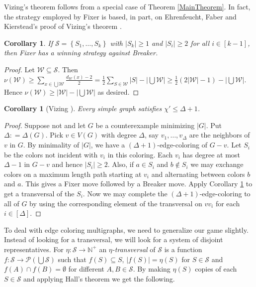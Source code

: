 \documentclass[12pt]{amsart}
\theoremstyle{plain}
\newtheorem{cor}[thm]{Corollary}
\theoremstyle{definition}
\theoremstyle{remark}
\newcommand{\fancy}[1]{\mathcal{#1}}
\newcommand{\IN}{\mathbb{N}}
\newcommand{\set}[1]{\left\{ #1 \right\}}
\newcommand{\card}[1]{\left|#1\right|}
\newcommand{\func}[3]{#1\colon #2 \rightarrow #3}
\newcommand{\irange}[1]{\left[#1\right]}
\newcommand{\parens}[1]{\left( #1 \right)}
\newcommand{\DefinedAs}{\mathrel{\mathop:}=}
\renewcommand{\S}{\fancy{S}}
\newcommand{\W}{\fancy{W}}
\renewcommand{\P}{\fancy{P}}
\begin{document}
Vizing's theorem follows from a special case of Theorem \ref{MainTheorem}.  
In fact, the strategy employed by Fixer is based, in part, on Ehrenfeucht, Faber
and Kierstead's proof of Vizing's theorem \cite{Ehrenfeucht1984159}.

\begin{cor}\label{Simple}
If $\S = \set{S_1, \ldots, S_k}$ with $\card{S_k} \geq 1$ and $\card{S_i} \geq
2$ for all $i \in \irange{k-1}$, then Fixer has a winning strategy against
Breaker.
\end{cor}

\begin{proof}
Let $\W \subseteq \S$. Then $\nu(\W) \geq \sum_{x
\in \bigcup \W} \frac{d_{\W}(x) - 2}{2} = \frac12 \sum_{S \in \W} \card{S} -
\card{\bigcup \W} \geq \frac12 (2\card{\W} - 1) -
\card{\bigcup \W}$.  Hence $\nu(\W) \geq \card{\W} - \card{\bigcup \W}$ as
desired.
\end{proof}

\begin{cor}[Vizing \cite{vizing}]
Every simple graph satisfies $\chi' \leq \Delta + 1$.
\end{cor}
\begin{proof}
Suppose not and let $G$ be a counterexample minimizing $\card{G}$. Put $\Delta
\DefinedAs \Delta(G)$.  Pick $v \in V(G)$ with
degree $\Delta$, say $v_1, \ldots, v_\Delta$ are the neighbors of $v$ in $G$. 
By minimality of $\card{G}$, we have a $(\Delta + 1)$-edge-coloring of $G -
v$. Let $S_i$ be the colors not incident with $v_i$ in this coloring. 
Each $v_i$ has degree at most $\Delta - 1$ in $G - v$ and hence
$\card{S_i} \geq 2$. Also, if $a \in S_i$ and $b \not \in S_i$ we
may exchange colors on a maximum length path starting at $v_i$ and alternating between colors $b$ and $a$. 
This gives a Fixer move followed by a Breaker move.  Apply Corollary
\ref{Simple} to get a transversal of the $S_i$. Now we may complete the $(\Delta +
1)$-edge-coloring to all of $G$ by using the corresponding element of the
transversal on $vv_i$ for each $i \in \irange{\Delta}$.
\end{proof}

To deal with edge coloring multigraphs, we need to generalize our game slightly.
Instead of looking for a transversal, we will look for a system of
disjoint representatives. For $\func{\eta}{\S}{\IN^+}$ an
\emph{$\eta$-transversal} of $\S$ is a function $\func{f}{\S}{\P\parens{\bigcup
\S}}$ such that $f(S) \subseteq S$, $\card{f(S)} = \eta(S)$ for $S \in \S$ and
$f(A) \cap f(B) = \emptyset$ for different $A,B \in \S$.  By making $\eta(S)$
copies of each $S \in \S$ and applying Hall's theorem we get the following.
\end{document}
